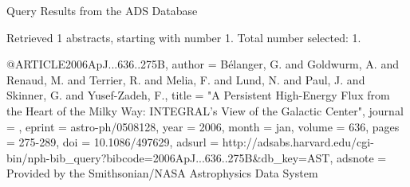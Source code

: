 Query Results from the ADS Database


Retrieved 1 abstracts, starting with number 1.  Total number selected: 1.

@ARTICLE{2006ApJ...636..275B,
   author = {{B{\'e}langer}, G. and {Goldwurm}, A. and {Renaud}, M. and {Terrier}, R. and 
	{Melia}, F. and {Lund}, N. and {Paul}, J. and {Skinner}, G. and 
	{Yusef-Zadeh}, F.},
    title = "{A Persistent High-Energy Flux from the Heart of the Milky Way: INTEGRAL's View of the Galactic Center}",
  journal = {\apj},
   eprint = {astro-ph/0508128},
     year = 2006,
    month = jan,
   volume = 636,
    pages = {275-289},
      doi = {10.1086/497629},
   adsurl = {http://adsabs.harvard.edu/cgi-bin/nph-bib_query?bibcode=2006ApJ...636..275B&db_key=AST},
  adsnote = {Provided by the Smithsonian/NASA Astrophysics Data System}
}


